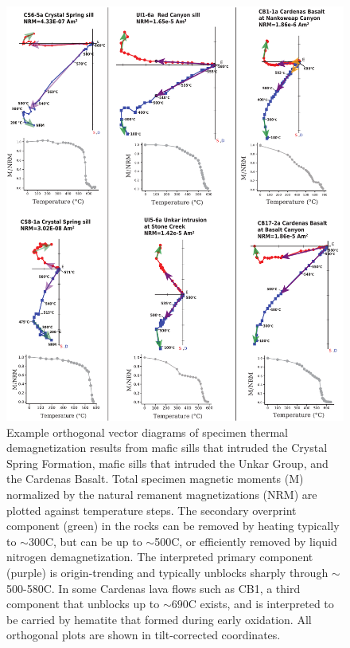 \documentclass[draft]{agujournal2019}
\begin{document}
\begin{figure}[h!]
\centering
\includegraphics[width=\textwidth]{demag_plots.pdf}
\caption{\footnotesize Example orthogonal vector diagrams of specimen thermal demagnetization results from mafic sills that intruded the Crystal Spring Formation, mafic sills that intruded the Unkar Group, and the Cardenas Basalt. Total specimen magnetic moments (M) normalized by the natural remanent magnetizations (NRM) are plotted against temperature steps. The secondary overprint component (green) in the rocks can be removed by heating typically to $\sim$300\textdegree C, but can be up to $\sim$500\textdegree C, or efficiently removed by liquid nitrogen demagnetization. The interpreted primary component (purple) is origin-trending and typically unblocks sharply through $\sim$500-580\textdegree C. In some Cardenas lava flows such as CB1, a third component that unblocks up to $\sim$690\textdegree C exists, and is interpreted to be carried by hematite that formed during early oxidation. All orthogonal plots are shown in tilt-corrected coordinates.}
\label{fig:demag_plots}
\end{figure}
\end{document}
